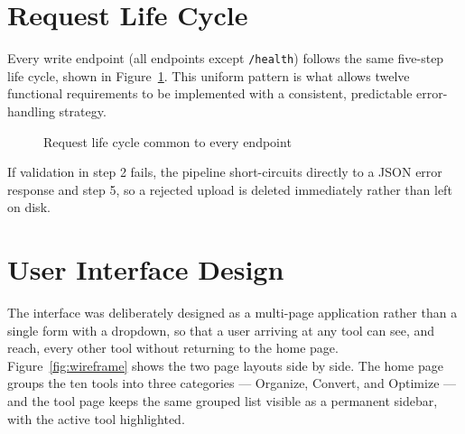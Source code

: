 \documentclass[12pt,a4paper]{report}
\begin{document}
\section{Request Life Cycle}
Every write endpoint (all endpoints except \texttt{/health}) follows the same five-step life
cycle, shown in Figure~\ref{fig:lifecycle}. This uniform pattern is what allows twelve
functional requirements to be implemented with a consistent, predictable error-handling
strategy.
\begin{figure}[h]
\centering
{}
\caption{Request life cycle common to every endpoint}
\label{fig:lifecycle}
\end{figure}

If validation in step 2 fails, the pipeline short-circuits directly to a JSON error response and
step 5, so a rejected upload is deleted immediately rather than left on disk.

\section{User Interface Design}
The interface was deliberately designed as a multi-page application rather than a single form
with a dropdown, so that a user arriving at any tool can see, and reach, every other tool without
returning to the home page. Figure~\ref{fig:wireframe} shows the two page layouts side by side.
The home page groups the ten tools into three categories --- Organize, Convert, and Optimize ---
and the tool page keeps the same grouped list visible as a permanent sidebar, with the active
tool highlighted.
\end{document}
